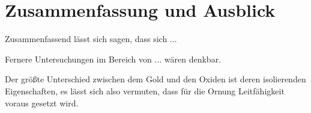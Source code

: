 \chapter{Zusammenfassung und Ausblick}
    Zusammenfassend lässt sich sagen, dass sich  ...

    Fernere Untersuchungen im Bereich von ... wären denkbar.

    Der größte Unterschied zwischen dem Gold und den Oxiden ist deren isolierenden Eigenschaften, es lässt sich also vermuten, dass für die Ornung Leitfähigkeit voraus gesetzt wird.
